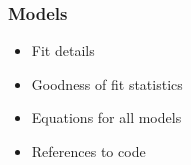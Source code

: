 \subsubsection{Models}

\begin{itemize}
\item Fit details
\item Goodness of fit statistics
\item Equations for all models
\item References to code
\end{itemize}
